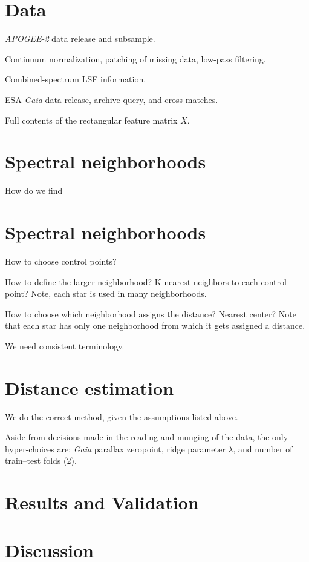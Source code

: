 \documentclass[modern]{aastex631}
\newcommand{\acronym}[1]{{\small{#1}}}
\newcommand{\project}[1]{\textsl{#1}}
\newcommand{\ESA}{\acronym{ESA}}
\newcommand{\Gaia}{\project{Gaia}}
\newcommand{\APOGEE}{\project{\acronym{APOGEE-2}}}
\begin{document}
\section{Data}

\APOGEE{} data release and subsample.

Continuum normalization, patching of missing data, low-pass filtering.

Combined-spectrum LSF information.

\ESA{} \Gaia{} data release, archive query, and cross matches.

Full contents of the rectangular feature matrix $X$.

\section{Spectral neighborhoods}

How do we find 

\section{Spectral neighborhoods}

How to choose control points?

How to define the larger neighborhood? K nearest neighbors to each control point? Note, each star is used in many neighborhoods.

How to choose which neighborhood assigns the distance? Nearest center? Note that each star has only one neighborhood from which it gets assigned a distance.

We need consistent terminology.

\section{Distance estimation}

We do the correct method, given the assumptions listed above.

Aside from decisions made in the reading and munging of the data, the
only hyper-choices are: \Gaia{} parallax zeropoint, ridge parameter
$\lambda$, and number of train--test folds (2).

\section{Results and Validation}

\section{Discussion}
\end{document}
